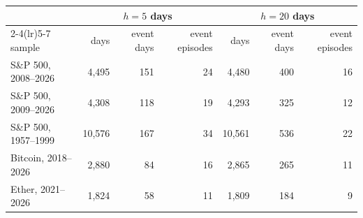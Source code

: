 \begin{tabular}{lrrrrrr}\toprule
 & \multicolumn{3}{c}{$h=5$ days} & \multicolumn{3}{c}{$h=20$ days}\\
\cmidrule(lr){2-4}\cmidrule(lr){5-7} sample & days & event days & event episodes & days & event days & event episodes\\\midrule
S\&P 500, 2008--2026 & 4,495 & 151 & 24 & 4,480 & 400 & 16\\
S\&P 500, 2009--2026 & 4,308 & 118 & 19 & 4,293 & 325 & 12\\
S\&P 500, 1957--1999 & 10,576 & 167 & 34 & 10,561 & 536 & 22\\
Bitcoin, 2018--2026 & 2,880 & 84 & 16 & 2,865 & 265 & 11\\
Ether, 2021--2026 & 1,824 & 58 & 11 & 1,809 & 184 & 9\\
\bottomrule\end{tabular}
